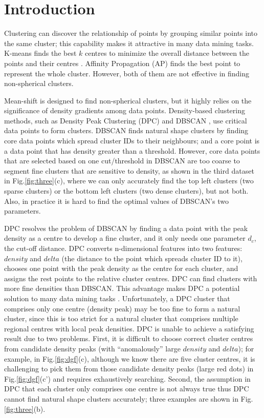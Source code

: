 \documentclass{llncs}
\begin{document}
\section{Introduction}
Clustering can discover the relationship of points by grouping similar points into the same cluster; this capability makes it attractive in many data mining tasks. K-means finds the best $k$ centres to minimize the overall distance between the points and their centres \cite{imagekmeans}. Affinity Propagation (AP) \cite{ap} finds the best point to represent the whole cluster. However, both of them are not effective in finding non-spherical clusters. 

Mean-shift \cite{meanshift} is designed to find non-spherical clusters, but it highly relies on the significance of density gradients among data points. Density-based clustering methods, such as Density Peak Clustering (DPC) \cite{dp} and DBSCAN \cite{dbscan}, use critical data points to form clusters. DBSCAN finds natural shape clusters by finding core data points which spread cluster IDs to their neighbours; and a core point is a data point that has density greater than a threshold. However, core data points that are selected based on one cut/threshold in DBSCAN are too coarse to segment fine clusters that are sensitive to density, as shown in the third dataset in Fig.\ref{fig:three}(c), where we can only accurately find the top left clusters (two sparse clusters) or the bottom left clusters (two dense clusters), but not both. Also, in practice it is hard to find the optimal values of DBSCAN's two parameters.

DPC \cite{dp} resolves the problem of DBSCAN by finding a data point with the peak density as a centre to develop a fine cluster, and it only needs one parameter $d_{c}$, the cut-off distance. DPC converts n-dimensional features into two features: $density$ and $delta$ (the distance to the point which spreads cluster ID to it), chooses one point with the peak density as the centre for each cluster, and assigns the rest points to the relative cluster centres. DPC can find clusters with more fine densities than DBSCAN. This advantage makes DPC a potential solution to many data mining tasks \cite{imagedp,textdp}. Unfortunately, a DPC cluster that comprises only one centre (density peak) may be too fine to form a natural cluster, since this is too strict for a natural cluster that comprises multiple regional centres with local peak densities. DPC is unable to achieve a satisfying result due to two problems. First, it is difficult to choose correct cluster centres from candidate density peaks (with ``anomalously'' large $density$ and $delta$); for example, in Fig.\ref{fig:dgf}(c), although we know there are five cluster centres, it is challenging to pick them from those candidate density peaks (large red dots) in Fig.\ref{fig:dgf}(c') and requires exhaustively searching. Second, the assumption in DPC that each cluster only comprises one centre is not always true thus DPC cannot find natural shape clusters accurately; three examples are shown in Fig.\ref{fig:three}(b). 
\end{document}
